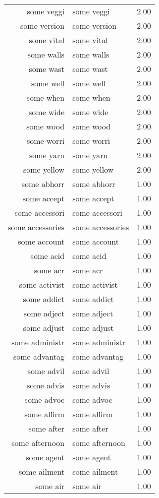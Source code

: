 \begin{table}[ht]
\begin{tabular}{rlr}
  some veggi & some veggi & 2.00 \\ 
  some version & some version & 2.00 \\ 
  some vital & some vital & 2.00 \\ 
  some walls & some walls & 2.00 \\ 
  some wast & some wast & 2.00 \\ 
  some well & some well & 2.00 \\ 
  some when & some when & 2.00 \\ 
  some wide & some wide & 2.00 \\ 
  some wood & some wood & 2.00 \\ 
  some worri & some worri & 2.00 \\ 
  some yarn & some yarn & 2.00 \\ 
  some yellow & some yellow & 2.00 \\ 
  some abhorr & some abhorr & 1.00 \\ 
  some accept & some accept & 1.00 \\ 
  some accessori & some accessori & 1.00 \\ 
  some accessories & some accessories & 1.00 \\ 
  some account & some account & 1.00 \\ 
  some acid & some acid & 1.00 \\ 
  some acr & some acr & 1.00 \\ 
  some activist & some activist & 1.00 \\ 
  some addict & some addict & 1.00 \\ 
  some adject & some adject & 1.00 \\ 
  some adjust & some adjust & 1.00 \\ 
  some administr & some administr & 1.00 \\ 
  some advantag & some advantag & 1.00 \\ 
  some advil & some advil & 1.00 \\ 
  some advis & some advis & 1.00 \\ 
  some advoc & some advoc & 1.00 \\ 
  some affirm & some affirm & 1.00 \\ 
  some after & some after & 1.00 \\ 
  some afternoon & some afternoon & 1.00 \\ 
  some agent & some agent & 1.00 \\ 
  some ailment & some ailment & 1.00 \\ 
  some air & some air & 1.00 \\ 

\end{tabular}
\end{table}
